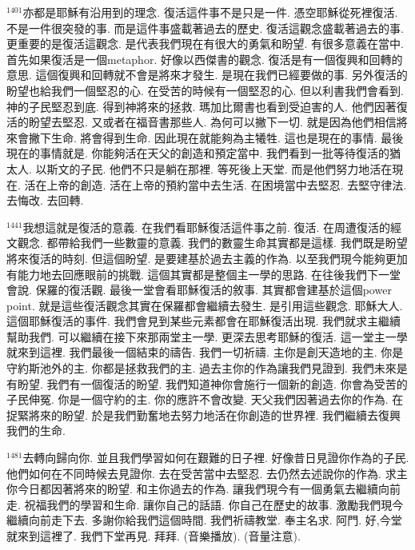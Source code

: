 \documentclass{book}
\begin{document}
$^{1401}$亦都是耶穌有沿用到的理念.
復活這件事不是只是一件.
憑空耶穌從死裡復活.
不是一件很突發的事.
而是這件事盛載著過去的歷史.
復活這觀念盛載著過去的事.
更重要的是復活這觀念.
是代表我們現在有很大的勇氣和盼望.
有很多意義在當中.
首先如果復活是一個metaphor.
好像以西傑書的觀念.
復活是有一個復興和回轉的意思.
這個復興和回轉就不會是將來才發生.
是現在我們已經要做的事.
另外復活的盼望也給我們一個堅忍的心.
在受苦的時候有一個堅忍的心.
但以利書我們會看到.
神的子民堅忍到底.
得到神將來的拯救.
瑪加比爾書也看到受迫害的人.
他們因著復活的盼望去堅忍.
又或者在福音書那些人.
為何可以撇下一切.
就是因為他們相信將來會撇下生命.
將會得到生命.
因此現在就能夠為主犧牲.
這也是現在的事情.
最後現在的事情就是.
你能夠活在天父的創造和預定當中.
我們看到一批等待復活的猶太人.
以斯文的子民.
他們不只是躺在那裡.
等死後上天堂.
而是他們努力地活在現在.
活在上帝的創造.
活在上帝的預約當中去生活.
在困境當中去堅忍.
去堅守律法.
去悔改.
去回轉.

$^{1441}$我想這就是復活的意義.
在我們看耶穌復活這件事之前.
復活.
在周遭復活的經文觀念.
都帶給我們一些數靈的意義.
我們的數靈生命其實都是這樣.
我們既是盼望將來復活的時刻.
但這個盼望.
是要建基於過去主義的作為.
以至我們現今能夠更加有能力地去回應眼前的挑戰.
這個其實都是整個主一學的思路.
在往後我們下一堂會說.
保羅的復活觀.
最後一堂會看耶穌復活的敘事.
其實都會建基於這個power point.
就是這些復活觀念其實在保羅都會繼續去發生.
是引用這些觀念.
耶穌大人.
這個耶穌復活的事件.
我們會見到某些元素都會在耶穌復活出現.
我們就求主繼續幫助我們.
可以繼續在接下來那兩堂主一學.
更深去思考耶穌的復活.
這一堂主一學就來到這裡.
我們最後一個結束的禱告.
我們一切祈禱.
主你是創天造地的主.
你是守約斯池外的主.
你都是拯救我們的主.
過去主你的作為讓我們見證到.
我們未來是有盼望.
我們有一個復活的盼望.
我們知道神你會施行一個新的創造.
你會為受苦的子民伸冤.
你是一個守約的主.
你的應許不會改變.
天父我們因著過去你的作為.
在捉緊將來的盼望.
於是我們勤奮地去努力地活在你創造的世界裡.
我們繼續去復興我們的生命.

$^{1481}$去轉向歸向你.
並且我們學習如何在艱難的日子裡.
好像昔日見證你作為的子民.
他們如何在不同時候去見證你.
去在受苦當中去堅忍.
去仍然去述說你的作為.
求主你今日都因著將來的盼望.
和主你過去的作為.
讓我們現今有一個勇氣去繼續向前走.
祝福我們的學習和生命.
讓你自己的話語.
你自己在歷史的故事.
激勵我們現今繼續向前走下去.
多謝你給我們這個時間.
我們祈禱教堂.
奉主名求.
阿門.
好,今堂就來到這裡了.
我們下堂再見.
拜拜.
(音樂播放).
(音量注意).
\newpage
\end{document}
